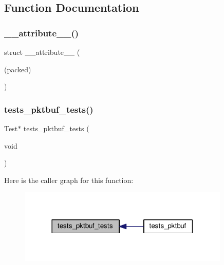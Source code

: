 \subsection{Function Documentation}
\mbox{\label{tests-pktbuf_8c_ab898071398b359603a35c202e9c65f3b}} 
\subsubsection{\texorpdfstring{\+\_\+\+\_\+attribute\+\_\+\+\_\+()}{\_\_attribute\_\_()}}
{\footnotesize\ttfamily struct \+\_\+\+\_\+attribute\+\_\+\+\_\+ (\begin{DoxyParamCaption}\item[{(packed)}]{ }\end{DoxyParamCaption})}

\mbox{\label{tests-pktbuf_8c_a00e3390935b3f1ed782d4db9907f7783}} 
\subsubsection{\texorpdfstring{tests\+\_\+pktbuf\+\_\+tests()}{tests\_pktbuf\_tests()}}
{\footnotesize\ttfamily Test$\ast$ tests\+\_\+pktbuf\+\_\+tests (\begin{DoxyParamCaption}\item[{void}]{ }\end{DoxyParamCaption})}

Here is the caller graph for this function\+:
\nopagebreak
\begin{figure}[H]
\begin{center}
\leavevmode
\includegraphics[width=285pt]{tests-pktbuf_8c_a00e3390935b3f1ed782d4db9907f7783_icgraph}
\end{center}
\end{figure}



